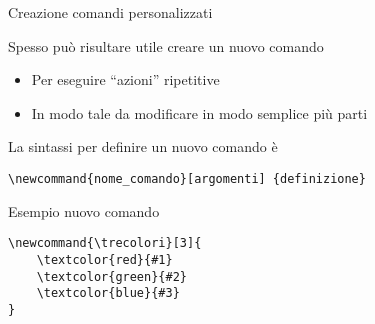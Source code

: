 \begin{frame}[fragile]{Creazione comandi personalizzati}

Spesso può risultare utile creare un nuovo comando
\begin{itemize}
	\item Per eseguire ``azioni'' ripetitive
	\item In modo tale da modificare in modo semplice più parti
\end{itemize}

La sintassi per definire un nuovo comando è
\begin{center}
    \texttt{\textbackslash{}newcommand\{nome\_comando\}[argomenti]
    \{definizione\}}
\end{center}

\begin{exampleblock}{Esempio nuovo comando}
	\begin{lstlisting}
\newcommand{\trecolori}[3]{
    \textcolor{red}{#1} 
    \textcolor{green}{#2} 
    \textcolor{blue}{#3}
}
	\end{lstlisting}
\end{exampleblock}


\end{frame}
